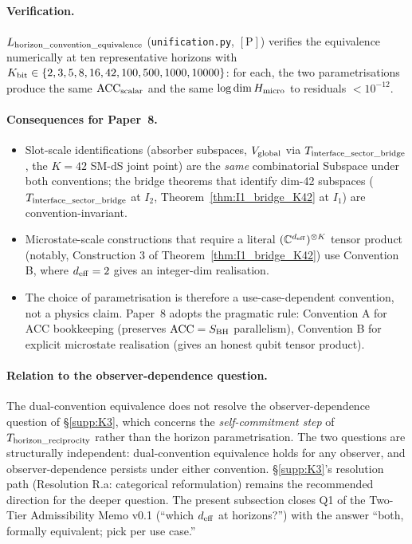 \documentclass[11pt]{article}
\theoremstyle{plain}
\theoremstyle{definition}
\theoremstyle{remark}
\begin{document}
\paragraph{Verification.}  $L_{\rm horizon\_convention\_equivalence}$ (\texttt{unification.py}, $[\mathrm{P}]$) verifies the equivalence numerically at ten representative horizons with $K_{\rm bit} \in \{2, 3, 5, 8, 16, 42, 100, 500, 1000, 10000\}$: for each, the two parametrisations produce the same $\mathrm{ACC}_{\rm scalar}$ and the same $\log \dim H_{\rm micro}$ to residuals $< 10^{-12}$.

\paragraph{Consequences for Paper~8.}
\begin{itemize}[leftmargin=2em,itemsep=2pt]
  \item Slot-scale identifications (absorber subspaces, $V_{\rm global}$ via $T_{\rm interface\_sector\_bridge}$, the $K = 42$ SM-dS joint point) are the \emph{same} combinatorial Subspace under both conventions; the bridge theorems that identify dim-42 subspaces ($T_{\rm interface\_sector\_bridge}$ at $I_2$, Theorem~\ref{thm:I1_bridge_K42} at $I_1$) are convention-invariant.
  \item Microstate-scale constructions that require a literal $(\mathbb{C}^{d_{\rm eff}})^{\otimes K}$ tensor product (notably, Construction 3 of Theorem~\ref{thm:I1_bridge_K42}) use Convention B, where $d_{\rm eff} = 2$ gives an integer-dim realisation.
  \item The choice of parametrisation is therefore a use-case-dependent convention, not a physics claim.  Paper~8 adopts the pragmatic rule: Convention A for ACC bookkeeping (preserves $\mathrm{ACC} = S_{\rm BH}$ parallelism), Convention B for explicit microstate realisation (gives an honest qubit tensor product).
\end{itemize}

\paragraph{Relation to the observer-dependence question.}  The dual-convention equivalence does not resolve the observer-dependence question of \S\ref{supp:K3}, which concerns the \emph{self-commitment step} of $T_{\rm horizon\_reciprocity}$ rather than the horizon parametrisation.  The two questions are structurally independent: dual-convention equivalence holds for any observer, and observer-dependence persists under either convention.  \S\ref{supp:K3}'s resolution path (Resolution R.a: categorical reformulation) remains the recommended direction for the deeper question.  The present subsection closes Q1 of the Two-Tier Admissibility Memo v0.1 (``which $d_{\rm eff}$ at horizons?'') with the answer ``both, formally equivalent; pick per use case.''
\end{document}
